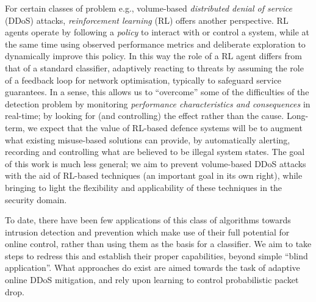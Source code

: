 \documentclass[10pt, times, conference, letterpaper]{IEEEtran}
\begin{document}
For certain classes of problem e.g., volume-based \emph{distributed denial of service} (DDoS) attacks, \emph{reinforcement learning} (RL) offers another perspective.
RL agents operate by following a \emph{policy} to interact with or control a system, while at the same time using observed performance metrics and deliberate exploration to dynamically improve this policy.
In this way the role of a RL agent differs from that of a standard classifier, adaptively reacting to threats by assuming the role of a feedback loop for network optimisation, typically to safeguard service guarantees.
In a sense, this allows us to ``overcome'' some of the difficulties of the detection problem by monitoring \emph{performance characteristics and consequences} in real-time; by looking for (and controlling) the effect rather than the cause.
Long-term, we expect that the value of RL-based defence systems will be to augment what existing misuse-based solutions can provide, by automatically alerting, recording and controlling what are believed to be illegal system states.
The goal of this work is much less general; we aim to prevent volume-based DDoS attacks with the aid of RL-based techniques (an important goal in its own right), while bringing to light the flexibility and applicability of these techniques in the security domain.

To date, there have been few applications of this class of algorithms towards intrusion detection and prevention which make use of their full potential for online control, rather than using them as the basis for a classifier.
We aim to take steps to redress this and establish their proper capabilities, beyond simple ``blind application''.
What approaches do exist are aimed towards the task of adaptive online DDoS mitigation, and rely upon learning to control probabilistic packet drop.
\end{document}
